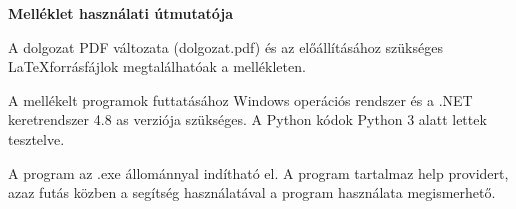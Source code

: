 \pagestyle{empty}

\noindent \textbf{\Large Melléklet használati útmutatója}

\vskip 1cm

A dolgozat PDF változata (dolgozat.pdf) és az előállításához szükséges \LaTeX forrásfájlok megtalálhatóak a mellékleten. 

A mellékelt programok futtatásához Windows operációs rendszer és a .NET keretrendszer 4.8 as verziója szükséges. A Python kódok Python 3 alatt lettek tesztelve. 

A program az .exe állománnyal indítható el. A program tartalmaz help providert, azaz futás közben a segítség használatával a program használata megismerhető. 